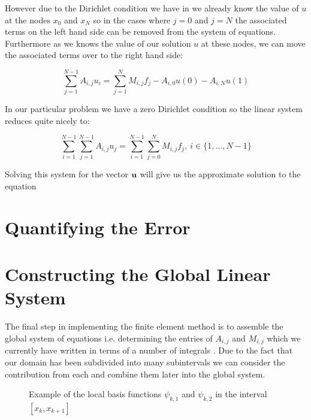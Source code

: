 However due to the Dirichlet condition we have in 
we already know the value of $u$ at the nodes $x_0$ and $x_N$ so in the cases
where $j = 0$ and $j = N$ the associated terms on the left hand side can be
removed from the system of equations. Furthermore as we knows the value of our
solution $u$ at these nodes, we can move the associated terms over to the right
hand side:

\begin{equation}
    \sum_{j=1}^{N-1}A_{i,j}u_i =
        \sum_{j=1}^{N}M_{i,j}f_j - A_{i,0}u(0) - A_{i,N}u(1)
\end{equation}

In our particular problem we have a zero Dirichlet condition so the linear
system reduces quite nicely to:

\begin{equation}\label{eq:oned-deterministic-fem}
    \sum_{i=1}^{N-1}\sum_{j=1}^{N-1}A_{i,j}u_j
        = \sum_{i=1}^{N-1}\sum_{j=0}^NM_{i,j}f_j,\ i \in \{1,\dots,N-1\}
\end{equation}

Solving this system for the vector $\mathbf{u}$ will give us the approximate
solution to the equation 

\section{Quantifying the Error}


\section{Constructing the Global Linear System}\label{sec:oned-deterministic-global-construct}

The final step in implementing the finite element method is to assemble the
global system of equations i.e.  determining the entries of $A_{i,j}$ and
$M_{i,j}$ which we currently have written in terms of a number of integrals
. Due to the fact that our domain has
been subdivided into many subintervals we can consider the contribution from
each and combine them later into the global system.

\begin{figure}
\centering

\caption{Example of the local basis functions $\psi_{k,1}$ and $\psi_{k,2}$
         in the interval $[x_k, x_{k + 1}]$}
\label{fig:oned-local-basis}
\end{figure}

